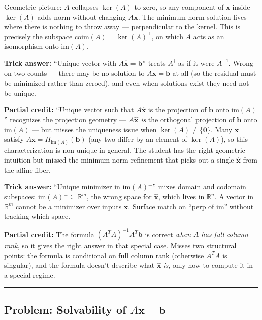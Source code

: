 \documentclass[12pt]{amsart}
\newcommand{\divider}{
  \vspace{-1em}
  \noindent
  \raisebox{-0.15ex}{\textbullet}%
  \hspace{0.5em}%
  \rule[0.5ex]{0.95\textwidth}{1.0pt}%
  \hspace{0.5em}%
  \raisebox{-0.15ex}{\textbullet}%
  \vspace{0em}
}
\begin{document}
Geometric picture: $A$ collapses $\ker(A)$ to zero, so any component of
$\mathbf{x}$ inside $\ker(A)$ adds norm without changing $A\mathbf{x}$.
The minimum-norm solution lives where there is nothing to throw away ---
perpendicular to the kernel. This is precisely the subspace
$\mathrm{coim}(A) = \ker(A)^\perp$, on which $A$ acts as an isomorphism
onto $\mathrm{im}(A)$.

\textbf{Trick answer:}
``Unique vector with $A\hat{\mathbf{x}} = \mathbf{b}$'' treats $A^\dagger$
as if it were $A^{-1}$. Wrong on two counts --- there may be no solution
to $A\mathbf{x} = \mathbf{b}$ at all (so the residual must be minimized
rather than zeroed), and even when solutions exist they need not be unique.

\textbf{Partial credit:}
``Unique vector such that $A\hat{\mathbf{x}}$ is the projection of
$\mathbf{b}$ onto $\mathrm{im}(A)$'' recognizes the projection geometry
--- $A\hat{\mathbf{x}}$ \emph{is} the orthogonal projection of $\mathbf{b}$
onto $\mathrm{im}(A)$ --- but misses the uniqueness issue when
$\ker(A) \neq \{\mathbf{0}\}$. Many $\mathbf{x}$ satisfy
$A\mathbf{x} = \Pi_{\mathrm{im}(A)}(\mathbf{b})$ (any two differ by an
element of $\ker(A)$), so this characterization is non-unique in general.
The student has the right geometric intuition but missed the
minimum-norm refinement that picks out a single $\hat{\mathbf{x}}$ from
the affine fiber.

\textbf{Trick answer:}
``Unique minimizer in $\mathrm{im}(A)^\perp$'' mixes domain and codomain
subspaces: $\mathrm{im}(A)^\perp \subseteq \mathbb{R}^m$, the wrong space
for $\hat{\mathbf{x}}$, which lives in $\mathbb{R}^n$. A vector in
$\mathbb{R}^m$ cannot be a minimizer over inputs $\mathbf{x}$. Surface
match on ``perp of im'' without tracking which space.

\textbf{Partial credit:}
The formula $(A^T A)^{-1} A^T \mathbf{b}$ is correct \emph{when $A$ has
full column rank}, so it gives the right answer in that special case.
Misses two structural points: the formula is conditional on full column
rank (otherwise $A^T A$ is singular), and the formula doesn't describe
what $\hat{\mathbf{x}}$ \emph{is}, only how to compute it in a special
regime.

\divider

\subsection*{Problem: Solvability of $A\mathbf{x} = \mathbf{b}$}
\end{document}

